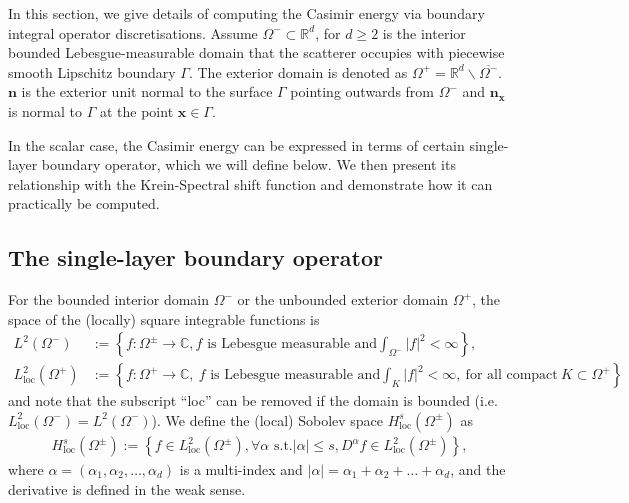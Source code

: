 
In this section, we give details of computing the Casimir energy via boundary integral operator discretisations. 
Assume 
$\Omega^{-}\subset \mathbb{R}^{d}$, for $d \geq 2$ is the interior bounded Lebesgue-measurable domain that the scatterer occupies with piecewise smooth Lipschitz boundary $\Gamma$. The exterior domain is denoted as 
$\Omega^{+} = \mathbb{R}^{d}\backslash\overline{\Omega^{-}}$. $\boldsymbol{n}$ is the exterior unit normal to the surface $\Gamma$ pointing outwards from $\Omega^{-}$ and 
$\boldsymbol{n}_{\boldsymbol{x}}$ is normal to $\Gamma$ at the point $\boldsymbol{x}\in\Gamma$.

In the scalar case, the Casimir energy can be expressed in terms of certain single-layer boundary operator, which we will define below. We then present its relationship with the Krein-Spectral shift function and demonstrate how it can practically be computed.

\subsection{The single-layer boundary operator}
For the bounded interior domain $\Omega^{-}$ or the unbounded exterior domain $\Omega^{+}$, the space of the (locally) square integrable functions is 
\begin{align*}
    L^{2}(\Omega^{-}) &:= \left\{f:\Omega^{\pm}\rightarrow\mathbb{C}, f \text{ is Lebesgue measurable and} \int_{\Omega^{-}}|f|^{2} < \infty \right\},\\
    L_{\text{loc}}^{2}(\Omega^{+}) &:= \left\{f:\Omega^{+}\rightarrow\mathbb{C},\ f \text{ is Lebesgue measurable and} \int_{K}|f|^{2} < \infty, \ \text{for all compact}\ K \subset \Omega^{+} \right\}
\end{align*}
and note that the subscript ``loc'' can be removed if the domain is bounded (i.e. $L_{\text{loc}}^{2}(\Omega^{-}) = L^{2}(\Omega^{-})$).
We define the (local) Sobolev space $H_{\text{loc}}^{s}(\Omega^{\pm})$ as 
\begin{align*}
    H_{\text{loc}}^{s}(\Omega^{\pm}):=\left\{f\in L_{\text{loc}}^{2}(\Omega^{\pm}), \forall\alpha \text{ s.t.} |\alpha|\leq s, D^{\alpha}f\in L_{\text{loc}}^{2}(\Omega^{\pm})\right\},
\end{align*}
where $\alpha = (\alpha_{1}, \alpha_{2}, \dots, \alpha_{d})$ is a multi-index and $|\alpha| = \alpha_{1} + \alpha_{2} + \dots + \alpha_{d}$, and 
the derivative is defined in the weak sense.


